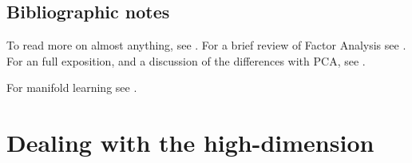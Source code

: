 \documentclass[12pt,a4paper]{article}
\begin{document}
%
%
%


\begin{remark}
\end{remark}




\subsection{Bibliographic notes}
To read more on almost anything, see \citet{friedman2001elements}.
For a brief review of Factor Analysis see \cite{friedman2001elements}.
For an full exposition, and a discussion of the differences with PCA, see \cite{jolliffe2002principal}.

For manifold learning see \citet{mohri2012foundations}.








\section{Dealing with the high-dimension}
\end{document}
